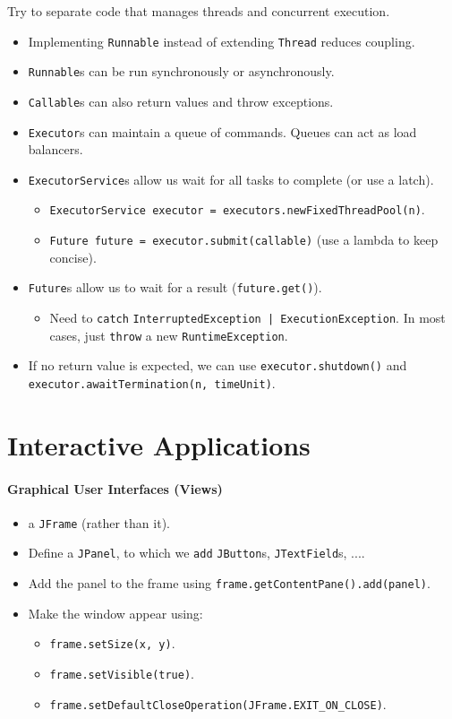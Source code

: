 \documentclass[twocolumn,english]{article}
\let\emph\relax
\begin{document}
Try to separate code that manages threads and concurrent execution. 
\begin{itemize}
\item Implementing \texttt{Runnable} instead of extending \texttt{Thread}
reduces coupling. 
\item \texttt{Runnable}s can be run synchronously or asynchronously. 
\item \texttt{Callable}s can also return values and throw exceptions. 
\item \texttt{Executor}s can maintain a queue of commands. Queues can act
as load balancers. 
\item \texttt{ExecutorService}s allow us wait for all tasks to complete
(or use a latch). 

\begin{itemize}
\item \texttt{ExecutorService executor = executors.newFixedThreadPool(n)}.
\item \texttt{Future future = executor.submit(callable)} (use a lambda to
keep concise).
\end{itemize}
\item \texttt{Future}s allow us to wait for a result (\texttt{future.get()}).

\begin{itemize}
\item Need to \texttt{catch} \texttt{InterruptedException | ExecutionException}.
In most cases, just \texttt{throw} a new \texttt{RuntimeException}.
\end{itemize}
\item If no return value is expected, we can use \texttt{executor.shutdown()}
and \texttt{executor.awaitTermination(n, timeUnit)}.
\end{itemize}

\section{Interactive Applications}


\paragraph{Graphical User Interfaces (Views)}
\begin{itemize}
\item \emph{Use} a \texttt{JFrame} (rather than \emph{extending} it). 
\item Define a \texttt{JPanel}, to which we \texttt{add} \texttt{JButton}s,
\texttt{JTextField}s, .... 
\item Add the panel to the frame using \texttt{frame.getContentPane().add(panel)}. 
\item Make the window appear using:

\begin{itemize}
\item \texttt{frame.setSize(x, y)}.
\item \texttt{frame.setVisible(true)}.
\item \texttt{frame.setDefaultCloseOperation(JFrame.EXIT\_ON\_CLOSE)}.
\end{itemize}
\end{itemize}
\end{document}

